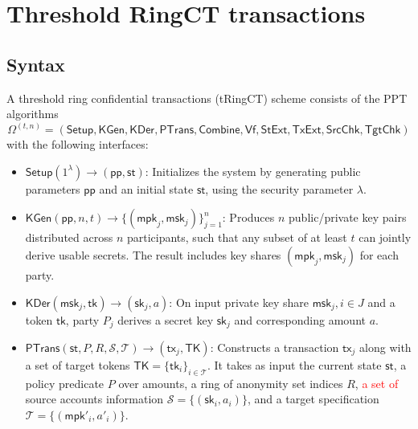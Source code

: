 
\section{Threshold RingCT transactions}

\subsection{Syntax}
\begin{definition}
A threshold ring confidential transactions (\textsf{tRingCT}) scheme consists of the PPT algorithms
\[
\Omega^{(t,n)} = (\mathsf{Setup}, \mathsf{KGen}, \mathsf{KDer}, \mathsf{PTrans}, \mathsf{Combine}, \mathsf{Vf}, \mathsf{StExt}, \mathsf{TxExt}, \mathsf{SrcChk}, \mathsf{TgtChk})
\]
with the following interfaces:

\begin{itemize}
    \item $\mathsf{Setup}(1^\lambda) \rightarrow (\mathsf{pp}, \mathsf{st})$: Initializes the system by generating public parameters $\mathsf{pp}$ and an initial state $\mathsf{st}$, using the security parameter $\lambda$.

    \item $\mathsf{KGen}(\mathsf{pp}, n, t) \rightarrow \{(\mathsf{mpk}_j, \mathsf{msk}_j)\}_{j=1}^n$: Produces $n$ public/private key pairs distributed across $n$ participants, such that any subset of at least $t$ can jointly derive usable secrets. The result includes key shares $(\mathsf{mpk}_j, \mathsf{msk}_j)$ for each party.

    \item $\mathsf{KDer}(\mathsf{msk}_j, \mathsf{tk}) \rightarrow (\mathsf{sk}_j, a)$: On input private key share $\mathsf{msk}_j, {i \in J}$ and a token $\mathsf{tk}$, party $P_j$ derives a secret key $\mathsf{sk}_j$ and corresponding amount $a$.

    \item $\mathsf{PTrans}(\mathsf{st}, P, R, \mathcal{S}, \mathcal{T}) \rightarrow (\mathsf{tx}_j, \mathsf{TK})$: Constructs a transaction $\mathsf{tx}_j$ along with a set of target tokens $\mathsf{TK} = \{\mathsf{tk}_i\}_{i \in \mathcal{T}}$. It takes as input the current state $\mathsf{st}$, a policy predicate $P$ over amounts, a ring of anonymity set indices $R$, \textcolor{red}{a set of} source accounts information $\mathcal{S} = \{(\mathsf{sk}_i, a_i)\}$, and a target specification $\mathcal{T} = \{(\mathsf{mpk}'_i, a'_i)\}$.


\end{itemize}
\end{definition}
